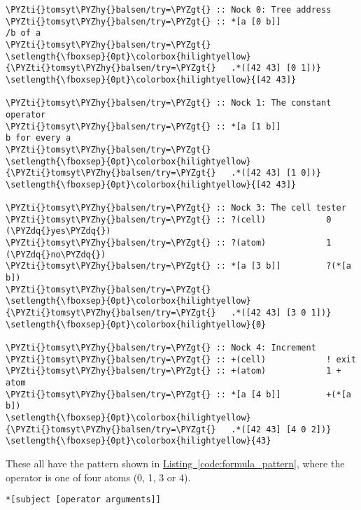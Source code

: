 \begin{codelisting}
\label{code:nock_review}
\begin{Verbatim}[fontsize=\relsize{-2.5},commandchars=\\\{\}]
\PYZti{}tomsyt\PYZhy{}balsen/try=\PYZgt{} :: Nock 0: Tree address
\PYZti{}tomsyt\PYZhy{}balsen/try=\PYZgt{} :: *[a [0 b]]               /b of a
\PYZti{}tomsyt\PYZhy{}balsen/try=\PYZgt{}
\setlength{\fboxsep}{0pt}\colorbox{hilightyellow}{\PYZti{}tomsyt\PYZhy{}balsen/try=\PYZgt{}   .*([42 43] [0 1])}
\setlength{\fboxsep}{0pt}\colorbox{hilightyellow}{[42 43]}

\PYZti{}tomsyt\PYZhy{}balsen/try=\PYZgt{} :: Nock 1: The constant operator
\PYZti{}tomsyt\PYZhy{}balsen/try=\PYZgt{} :: *[a [1 b]]               b for every a
\PYZti{}tomsyt\PYZhy{}balsen/try=\PYZgt{}
\setlength{\fboxsep}{0pt}\colorbox{hilightyellow}{\PYZti{}tomsyt\PYZhy{}balsen/try=\PYZgt{}   .*([42 43] [1 0])}
\setlength{\fboxsep}{0pt}\colorbox{hilightyellow}{[42 43]}

\PYZti{}tomsyt\PYZhy{}balsen/try=\PYZgt{} :: Nock 3: The cell tester
\PYZti{}tomsyt\PYZhy{}balsen/try=\PYZgt{} :: ?(cell)            0 (\PYZdq{}yes\PYZdq{})
\PYZti{}tomsyt\PYZhy{}balsen/try=\PYZgt{} :: ?(atom)            1 (\PYZdq{}no\PYZdq{})
\PYZti{}tomsyt\PYZhy{}balsen/try=\PYZgt{} :: *[a [3 b]]         ?(*[a b])
\PYZti{}tomsyt\PYZhy{}balsen/try=\PYZgt{}
\setlength{\fboxsep}{0pt}\colorbox{hilightyellow}{\PYZti{}tomsyt\PYZhy{}balsen/try=\PYZgt{}   .*([42 43] [3 0 1])}
\setlength{\fboxsep}{0pt}\colorbox{hilightyellow}{0}

\PYZti{}tomsyt\PYZhy{}balsen/try=\PYZgt{} :: Nock 4: Increment
\PYZti{}tomsyt\PYZhy{}balsen/try=\PYZgt{} :: +(cell)            ! exit
\PYZti{}tomsyt\PYZhy{}balsen/try=\PYZgt{} :: +(atom)            1 + atom
\PYZti{}tomsyt\PYZhy{}balsen/try=\PYZgt{} :: *[a [4 b]]         +(*[a b])
\setlength{\fboxsep}{0pt}\colorbox{hilightyellow}{\PYZti{}tomsyt\PYZhy{}balsen/try=\PYZgt{}   .*([42 43] [4 0 2])}
\setlength{\fboxsep}{0pt}\colorbox{hilightyellow}{43}
\end{Verbatim}
\end{codelisting}

These all have the pattern shown in \hyperref[code:formula_pattern]{Listing~\ref{code:formula_pattern}}, where the operator is one of four atoms (0, 1, 3 or 4).

\begin{codelisting}
\label{code:formula_pattern}
\codecaption{}
\begin{Verbatim}[fontsize=\relsize{-2.5},commandchars=\\\{\}]
*[subject [operator arguments]]
\end{Verbatim}
\end{codelisting}

